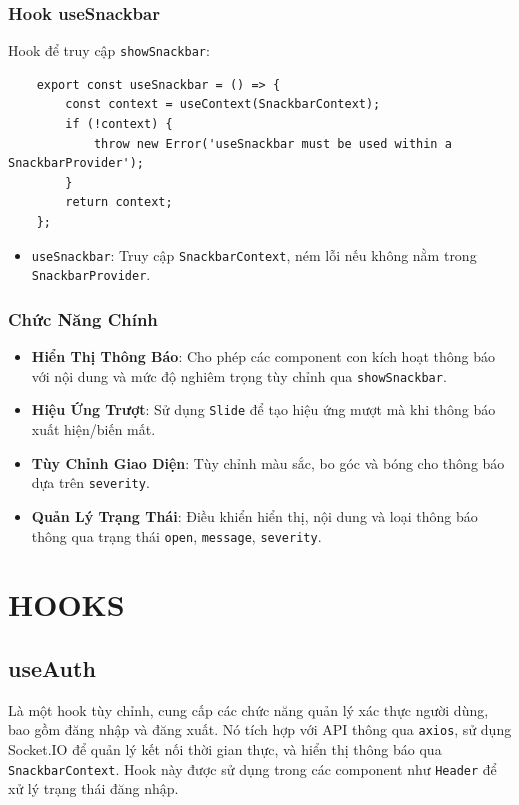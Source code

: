             \subsubsection{Hook useSnackbar}
                \hspace*{0.6cm}Hook để truy cập \texttt{showSnackbar}:
                \begin{lstlisting}
    export const useSnackbar = () => {
        const context = useContext(SnackbarContext);
        if (!context) {
            throw new Error('useSnackbar must be used within a SnackbarProvider');
        }
        return context;
    };
                \end{lstlisting}
                \begin{itemize}
                    \item \texttt{useSnackbar}: Truy cập \texttt{SnackbarContext}, ném lỗi nếu không nằm trong \texttt{SnackbarProvider}.
                \end{itemize}

            \subsubsection{Chức Năng Chính}
                \begin{itemize}
                    \item \textbf{Hiển Thị Thông Báo}: Cho phép các component con kích hoạt thông báo với nội dung và mức độ nghiêm trọng tùy chỉnh qua \texttt{showSnackbar}.
                    \item \textbf{Hiệu Ứng Trượt}: Sử dụng \texttt{Slide} để tạo hiệu ứng mượt mà khi thông báo xuất hiện/biến mất.
                    \item \textbf{Tùy Chỉnh Giao Diện}: Tùy chỉnh màu sắc, bo góc và bóng cho thông báo dựa trên \texttt{severity}.
                    \item \textbf{Quản Lý Trạng Thái}: Điều khiển hiển thị, nội dung và loại thông báo thông qua trạng thái \texttt{open}, \texttt{message}, \texttt{severity}.
                \end{itemize}
    \section{HOOKS}
        \subsection{useAuth}
            \hspace*{0.6cm}Là một hook tùy chỉnh, cung cấp các chức năng quản lý xác thực người dùng, bao gồm đăng nhập và đăng xuất. Nó tích hợp với API thông qua \texttt{axios}, sử dụng Socket.IO để quản lý kết nối thời gian thực, và hiển thị thông báo qua \texttt{SnackbarContext}. Hook này được sử dụng trong các component như \texttt{Header} để xử lý trạng thái đăng nhập.
